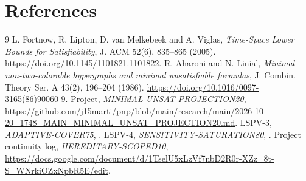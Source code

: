 \documentclass[11pt]{article}
\begin{document}
\section{References}
\begin{thebibliography}{9}
 L. Fortnow, R. Lipton, D. van Melkebeek and A. Viglas, \emph{Time-Space Lower Bounds for Satisfiability}, J. ACM 52(6), 835--865 (2005). \url{https://doi.org/10.1145/1101821.1101822}.
 R. Aharoni and N. Linial, \emph{Minimal non-two-colorable hypergraphs and minimal unsatisfiable formulas}, J. Combin. Theory Ser. A 43(2), 196--204 (1986). \url{https://doi.org/10.1016/0097-3165(86)90060-9}.
 Project, \emph{MINIMAL-UNSAT-PROJECTION20}, \url{https://github.com/j15marti/pnp/blob/main/research/main/2026-10-20_1748_MAIN_MINIMAL_UNSAT_PROJECTION20.md}.
 LSPV-3, \emph{ADAPTIVE-COVER75}, .
 LSPV-4, \emph{SENSITIVITY-SATURATION80}, .
 Project continuity log, \emph{HEREDITARY-SCOPED10}, \url{https://docs.google.com/document/d/1TselU5xLzVf7nbD2R0r-XZz_8t-S_WNrkiOZxNpbR5E/edit}.
\end{thebibliography}
\end{document}
